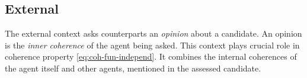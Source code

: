 \subsection{External}

The external context asks counterparts an \emph{opinion} about a candidate.
An opinion is the \emph{inner coherence} of the agent being asked. This context
plays crucial role in coherence property \ref{eq:coh-fun-independ}. It combines
the internal coherences of the agent itself and other agents, mentioned in the
assessed candidate.




